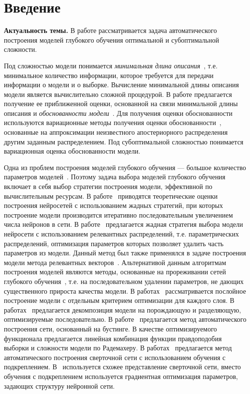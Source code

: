 \newpage{}
\chapter*{Введение}


\textbf{Актуальность темы.} В работе рассматривается задача автоматического построения моделей глубокого обучения оптимальной и субоптимальной сложности. 

Под сложностью модели понимается \emph{минимальная длина описания}~\cite{mdl}, т.е. минимальное количество информации, которое требуется для передачи информации о модели и о выборке. Вычисление минимальной длины описания модели является вычислительно сложной процедурой. В работе предлагается получение ее приближенной оценки, основанной на связи минимальной длины описания и \emph{обоснованности модели}~\cite{mdl}. Для получения оценки обоснованности используются вариационные методы получения оценки обоснованности~\cite{bishop}, основанные на аппроксимации неизвестного апостериорного распределения другим заданным распределением. Под субоптимальной сложностью понимается вариационная оценка обоснованности модели.

Одна из проблем построения моделей глубокого обучения --- большое количество параметров моделей~\cite{hinton_rbm, hinton_init}. Поэтому задача выбора моделей глубокого обучения включает в себя выбор стратегии построения модели, эффективной по вычислительным ресурсам. В работе~\cite{greed} приводятся теоретические оценки построения нейросетей с использованием жадных стратегий,  при которых построение модели производится итеративно последовательным увеличением числа нейронов в сети. В работе~\cite{greed_mlp} предлагается жадная стратегия выбора модели нейросети с использованием релевантных распределений, т.е. параметрических распределений, оптимизация параметров которых позволяет удалить часть параметров из модели. Данный метод был также применялся в задаче построения модели метода релевантных векторов~\cite{rvm}. Альтернативой данным алгоритмам построения моделей являются методы, основанные на прореживании сетей глубокого обучения~\cite{obd, popova, nvidia_prune}, т.е. на последовательном удалении параметров, не дающих существенного прироста качества модели. 
В работах~\cite{Bengio, hd} рассматривается послойное построение модели с отдельным критерием оптимизации для каждого слоя. В работах~\cite{Kingma, gendis_pictures, gendis_phd} предлагается декомпозиция модели на порождающую и разделяющую, оптимизируемые последовательно. В работе~\cite{adanet} предлагается метод автоматического построения сети, основанный на бустинге. В качестве оптимизируемого функционала предлагается линейная комбинация функции правдоподобия выборки и сложности модели по Радемахеру. 
В работах~\cite{reinf,reinf_predict,reinf_deep2net,reinf_transfer} предлагается метод автоматического построения сверточной сети с использованием обучения с подкреплением. В~\cite{darts} используется схожее представление сверточной сети, вместо обучения с подкреплением используется градиентная оптимизация параметров, задающих структуру нейронной сети.

